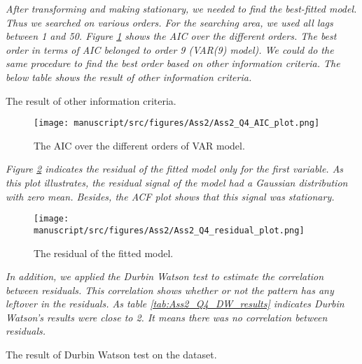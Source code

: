 \textit{After transforming and making stationary, we needed to find the best-fitted model. Thus we searched on various orders. For the searching area, we used all lags between 1 and 50. Figure \ref{fig:Ass2_Q4_AIC_plot} shows the \gls{AIC} over the different orders. The best order in terms of \gls{AIC} belonged to order 9 (VAR(9) model). We could do the same procedure to find the best order based on other information criteria. The below table shows the result of other information criteria.}

\begin{table}[H]
\centering
\caption{The result of other information criteria.}
\label{tab:Ass2_Q4_criteria}

\end{table}


\begin{figure}[H]
    \centering
    \begin{minipage}[b]{1\textwidth}
        \texttt{[image: manuscript/src/figures/Ass2/Ass2\_Q4\_AIC\_plot.png]}
    \end{minipage}
    \caption{The \gls{AIC} over the different orders of VAR model.}
    \label{fig:Ass2_Q4_AIC_plot}
\end{figure}

\textit{Figure \ref{fig:Ass2_Q4_residual_plot} indicates the residual of the fitted model only for the first variable. As this plot illustrates, the residual signal of the model had a Gaussian distribution with zero mean. Besides, the \gls{ACF} plot shows that this signal was stationary.}



\begin{figure}[H]
    \centering
    \begin{minipage}[b]{0.8\textwidth}
        \texttt{[image: manuscript/src/figures/Ass2/Ass2\_Q4\_residual\_plot.png]}
    \end{minipage}
    \caption{The residual of the fitted model.}
    \label{fig:Ass2_Q4_residual_plot}
\end{figure}


\textit{In addition, we applied the Durbin Watson test to estimate the correlation between residuals. This correlation shows whether or not the pattern has any leftover in the residuals. As table \ref{tab:Ass2_Q4_DW_results} indicates Durbin Watson's results were close to 2. It means there was no correlation between residuals. } 

\begin{table}[H]
\centering
\caption{The result of Durbin Watson test on the dataset.}
\label{tab:Ass2_Q4_DW_results}

\end{table}




